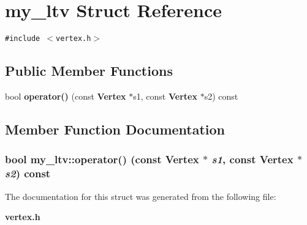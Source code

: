 \section{my\_\-ltv Struct Reference}
\label{structmy__ltv}
{\tt \#include $<$vertex.h$>$}

\subsection*{Public Member Functions}
\begin{CompactItemize}
\item 
bool {\bf operator()} (const {\bf Vertex} $\ast$s1, const {\bf Vertex} $\ast$s2) const
\end{CompactItemize}


\subsection{Member Function Documentation}
\subsubsection{\setlength{\rightskip}{0pt plus 5cm}bool my\_\-ltv::operator() (const {\bf Vertex} $\ast$ {\em s1}, const {\bf Vertex} $\ast$ {\em s2}) const\hspace{0.3cm}{\tt  [inline]}}\label{structmy__ltv_477865948fdc569e7f3ce6dfb4f8ba48}




The documentation for this struct was generated from the following file:\begin{CompactItemize}
\item 
{\bf vertex.h}\end{CompactItemize}
